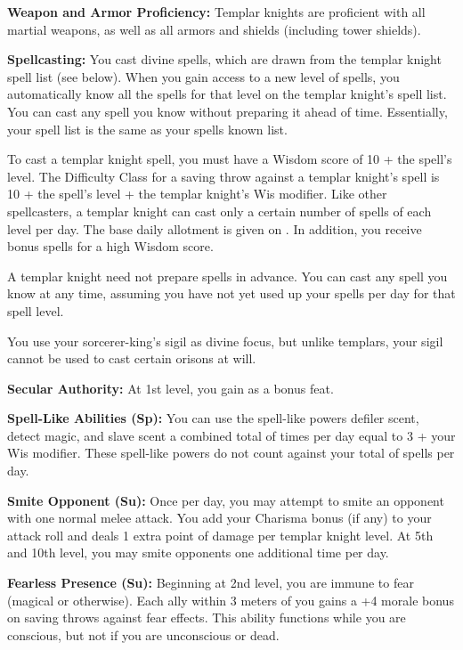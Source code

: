 {
\textbf{Weapon and Armor Proficiency:} Templar knights are proficient with all martial weapons, as well as all armors and shields (including tower shields).

\textbf{Spellcasting:} You cast divine spells, which are drawn from the templar knight spell list (see below). When you gain access to a new level of spells, you automatically know all the spells for that level on the templar knight's spell list. You can cast any spell you know without preparing it ahead of time. Essentially, your spell list is the same as your spells known list.

To cast a templar knight spell, you must have a Wisdom score of 10 + the spell's level. The Difficulty Class for a saving throw against a templar knight's spell is 10 + the spell's level + the templar knight's Wis modifier. Like other spellcasters, a templar knight can cast only a certain number of spells of each level per day. The base daily allotment is given on . In addition, you receive bonus spells for a high Wisdom score.

A templar knight need not prepare spells in advance. You can cast any spell you know at any time, assuming you have not yet used up your spells per day for that spell level.

You use your sorcerer-king's sigil as divine focus, but unlike templars, your sigil cannot be used to cast certain orisons at will.

\textbf{Secular Authority:} At 1st level, you gain  as a bonus feat.

\textbf{Spell-Like Abilities (Sp):} You can use the spell-like powers defiler scent, detect magic, and slave scent a combined total of times per day equal to 3 + your Wis modifier. These spell-like powers do not count against your total of spells per day.

\textbf{Smite Opponent (Su):} Once per day, you may attempt to smite an opponent with one normal melee attack. You add your Charisma bonus (if any) to your attack roll and deals 1 extra point of damage per templar knight level. At 5th and 10th level, you may smite opponents one additional time per day.

\textbf{Fearless Presence (Su):} Beginning at 2nd level, you are immune to fear (magical or otherwise). Each ally within 3 meters of you gains a +4 morale bonus on saving throws against fear effects. This ability functions while you are conscious, but not if you are unconscious or dead.

}
